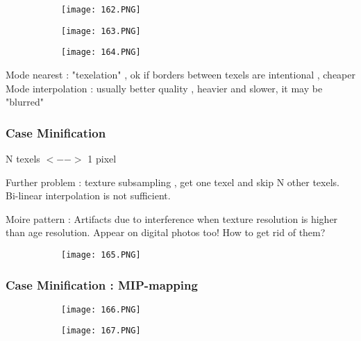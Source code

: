 \documentclass{article}
\begin{document}
\begin{figure}[ht!]
  \centering
  \begin{subfigure}[b]{0.4\linewidth}
    \texttt{[image: 162.PNG]}
  \end{subfigure}
\end{figure}


\begin{figure}[ht!]
  \centering
  \begin{subfigure}[b]{0.49\linewidth}
    \texttt{[image: 163.PNG]}
  \end{subfigure}
  \begin{subfigure}[b]{0.3\textwidth}
         \centering
         \texttt{[image: 164.PNG]}
     \end{subfigure}
\end{figure}

Mode nearest : "texelation" , ok if borders between texels are intentional , cheaper
Mode interpolation : usually better quality , heavier and slower, it may be "blurred"

\subsubsection{Case Minification}

N texels $<-->$ 1 pixel

Further problem : texture subsampling , get one texel and skip N other texels. Bi-linear interpolation is not sufficient.


Moire pattern : Artifacts due to interference when texture resolution is higher than age resolution. Appear on digital photos too!
How to get rid of them?

\begin{figure}[ht!]
  \centering
  \begin{subfigure}[b]{0.2\linewidth}
    \texttt{[image: 165.PNG]}
  \end{subfigure}
\end{figure}

\subsubsection{Case Minification : MIP-mapping}



\begin{figure}[ht!]
  \centering
  \begin{subfigure}[b]{0.4\linewidth}
    \texttt{[image: 166.PNG]}
  \end{subfigure}
  \begin{subfigure}[b]{0.4\textwidth}
         \centering
         \texttt{[image: 167.PNG]}
     \end{subfigure}
\end{figure}
\end{document}
